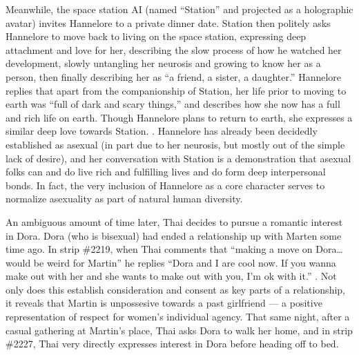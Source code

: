 \documentclass[man,12pt]{apa6}
\begin{document}
Meanwhile, the space station AI (named ``Station'' and projected as a holographic avatar) invites Hannelore to a private dinner date. Station then politely asks Hannelore to move back to living on the space station, expressing deep attachment and love for her, describing the slow process of how he watched her development, slowly untangling her neurosis and growing to know her as a person, then finally describing her as ``a friend, a sister, a daughter.'' Hannelore replies that apart from the companionship of Station, her life prior to moving to earth was ``full of dark and scary things,'' and describes how she now has a full and rich life on earth. Though Hannelore plans to return to earth, she expresses a similar deep love towards Station. \cite{qc}. Hannelore has already been decidedly established as asexual (in part due to her neurosis, but mostly out of the simple lack of desire), and her conversation with Station is a demonstration that asexual folks can and do live rich and fulfilling lives and do form deep interpersonal bonds. In fact, the very inclusion of Hannelore as a core character serves to normalize asexuality as part of natural human diversity. 

An ambiguous amount of time later, Thai decides to pursue a romantic interest in Dora. Dora (who is bisexual) had ended a relationship up with Marten some time ago. In strip \#2219, when Thai comments that ``making a move on Dora\ldots would be weird for Martin'' he replies ``Dora and I are cool now. If you wanna make out with her and she wants to make out with you, I'm ok with it.'' \cite{qc}. Not only does this establish consideration and consent as key parts of a relationship, it reveals that Martin is unpossesive towards a past girlfriend --- a positive representation of respect for women's individual agency. That same night, after a casual gathering at Martin's place, Thai asks Dora to walk her home, and in strip \#2227, Thai very directly expresses interest in Dora before heading off to bed.
\end{document}
